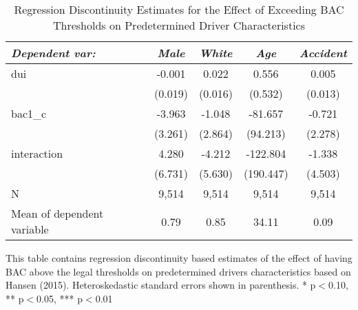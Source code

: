 \begin{table}[htbp]\centering
\small
\caption{Regression Discontinuity Estimates for the Effect of Exceeding BAC Thresholds on Predetermined Driver Characteristics}
\begin{center}
\begin{threeparttable}
\begin{tabular}{l*{4}{c}}
\toprule
\multicolumn{1}{l}{\textit{Dependent var: }}&
\multicolumn{1}{c}{\textit{Male}}&
\multicolumn{1}{c}{\textit{White}}&
\multicolumn{1}{c}{\textit{Age}}&
\multicolumn{1}{c}{\textit{Accident}}\\
\midrule
dui                 &      -0.001   &       0.022   &       0.556   &       0.005   \\
                    &     (0.019)   &     (0.016)   &     (0.532)   &     (0.013)   \\
bac1\_c              &      -3.963   &      -1.048   &     -81.657   &      -0.721   \\
                    &     (3.261)   &     (2.864)   &    (94.213)   &     (2.278)   \\
interaction         &       4.280   &      -4.212   &    -122.804   &      -1.338   \\
                    &     (6.731)   &     (5.630)   &   (190.447)   &     (4.503)   \\
\midrule
N                   &       9,514   &       9,514   &       9,514   &       9,514   \\
Mean of dependent variable&        0.79   &        0.85   &       34.11   &        0.09   \\
\bottomrule
\end{tabular}
\begin{tablenotes}
\tiny
\item This table contains regression discontinuity based estimates of the effect of having BAC above the legal thresholds on predetermined  drivers characteristics based on Hansen (2015).  Heteroskedastic standard errors shown in parenthesis.  * p$<$0.10, ** p$<$0.05, *** p$<$0.01
\end{tablenotes}
\end{threeparttable}
\end{center}
\end{table}
